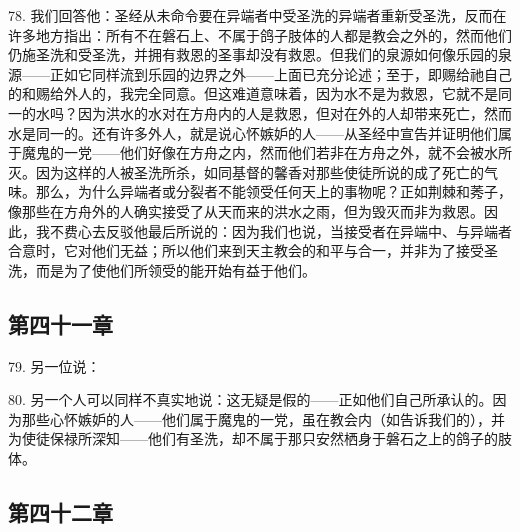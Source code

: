 78. 我们回答他：圣经从未命令要在异端者中受圣洗的异端者重新受圣洗，反而在许多地方指出：所有不在磐石上、不属于鸽子肢体的人都是教会之外的，然而他们仍施圣洗和受圣洗，并拥有救恩的圣事却没有救恩。但我们的泉源如何像乐园的泉源——正如它同样流到乐园的边界之外——上面已充分论述；至于，即赐给祂自己的和赐给外人的，我完全同意。但这难道意味着，因为水不是为救恩，它就不是同一的水吗？因为洪水的水对在方舟内的人是救恩，但对在外的人却带来死亡，然而水是同一的。还有许多外人，就是说心怀嫉妒的人——从圣经中宣告并证明他们属于魔鬼的一党——他们好像在方舟之内，然而他们若非在方舟之外，就不会被水所灭。因为这样的人被圣洗所杀，如同基督的馨香对那些使徒所说的成了死亡的气味。那么，为什么异端者或分裂者不能领受任何天上的事物呢？正如荆棘和莠子，像那些在方舟外的人确实接受了从天而来的洪水之雨，但为毁灭而非为救恩。因此，我不费心去反驳他最后所说的：因为我们也说，当接受者在异端中、与异端者合意时，它对他们无益；所以他们来到天主教会的和平与合一，并非为了接受圣洗，而是为了使他们所领受的能开始有益于他们。\par


\subsection{第四十一章}

79. 另一位说：\par

80. 另一个人可以同样不真实地说：这无疑是假的——正如他们自己所承认的。因为那些心怀嫉妒的人——他们属于魔鬼的一党，虽在教会内（如告诉我们的），并为使徒保禄所深知——他们有圣洗，却不属于那只安然栖身于磐石之上的鸽子的肢体。\par


\subsection{第四十二章}

